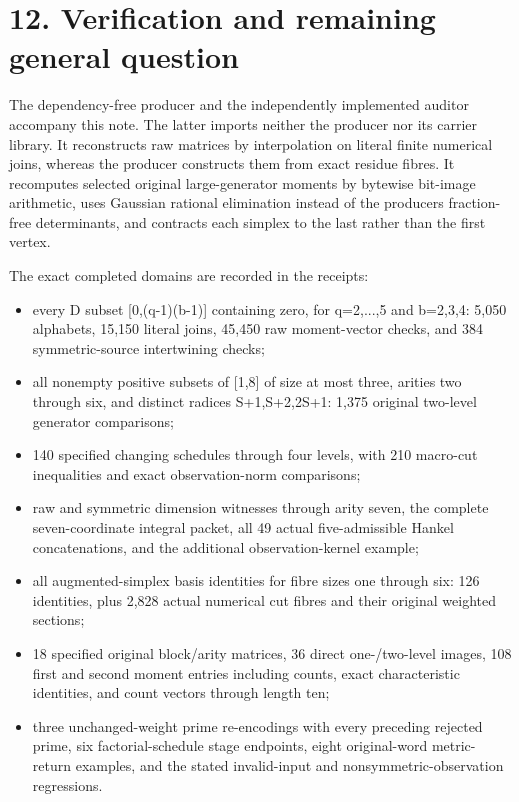 \section{12. Verification and remaining general question}\label{n24-verification-and-remaining-general-question}

The dependency-free producer and the independently implemented auditor accompany this note. The latter imports neither the producer nor its carrier library. It reconstructs raw matrices by interpolation on literal finite numerical joins, whereas the producer constructs them from exact residue fibres. It recomputes selected original large-generator moments by bytewise bit-image arithmetic, uses Gaussian rational elimination instead of the producer\textquotesingle s fraction-free determinants, and contracts each simplex to the last rather than the first vertex.

The exact completed domains are recorded in the receipts:

\begin{itemize}
\tightlist
\item
  every D subset {[}0,(q-1)(b-1){]} containing zero, for q=2,...,5 and b=2,3,4: 5,050 alphabets, 15,150 literal joins, 45,450 raw moment-vector checks, and 384 symmetric-source intertwining checks;
\item
  all nonempty positive subsets of {[}1,8{]} of size at most three, arities two through six, and distinct radices S+1,S+2,2S+1: 1,375 original two-level generator comparisons;
\item
  140 specified changing schedules through four levels, with 210 macro-cut inequalities and exact observation-norm comparisons;
\item
  raw and symmetric dimension witnesses through arity seven, the complete seven-coordinate integral packet, all 49 actual five-admissible Hankel concatenations, and the additional observation-kernel example;
\item
  all augmented-simplex basis identities for fibre sizes one through six: 126 identities, plus 2,828 actual numerical cut fibres and their original weighted sections;
\item
  18 specified original block/arity matrices, 36 direct one-/two-level images, 108 first and second moment entries including counts, exact characteristic identities, and count vectors through length ten;
\item
  three unchanged-weight prime re-encodings with every preceding rejected prime, six factorial-schedule stage endpoints, eight original-word metric-return examples, and the stated invalid-input and nonsymmetric-observation regressions.
\end{itemize}


